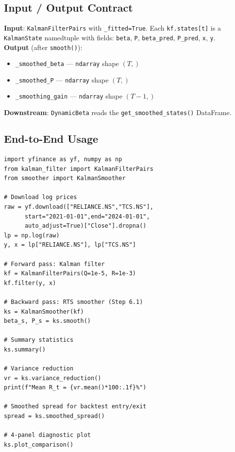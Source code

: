 \documentclass[10pt,a4paper,twocolumn]{article}
\begin{document}
\subsection{Input / Output Contract}

\begin{tcolorbox}[notebox={Interface Specification}]
\textbf{Input}: \texttt{KalmanFilterPairs} with
\texttt{\_fitted=True}.  Each \texttt{kf.states[t]} is a
\texttt{KalmanState} namedtuple with fields:
\texttt{beta}, \texttt{P}, \texttt{beta\_pred},
\texttt{P\_pred}, \texttt{x}, \texttt{y}.\\[4pt]
\textbf{Output} (after \texttt{smooth()}):
\begin{itemize}\setlength\itemsep{0pt}
  \item \texttt{\_smoothed\_beta} --- \texttt{ndarray} shape $(T,)$
  \item \texttt{\_smoothed\_P} --- \texttt{ndarray} shape $(T,)$
  \item \texttt{\_smoothing\_gain} --- \texttt{ndarray} shape $(T-1,)$
\end{itemize}
\textbf{Downstream}: \texttt{DynamicBeta} reads the
\texttt{get\_smoothed\_states()} DataFrame.
\end{tcolorbox}

\subsection{End-to-End Usage}

\begin{tcolorbox}[codebox={Pipeline Usage (RELIANCE / TCS)}]
\begin{lstlisting}[style=pythonplain]
import yfinance as yf, numpy as np
from kalman_filter import KalmanFilterPairs
from smoother import KalmanSmoother

# Download log prices
raw = yf.download(["RELIANCE.NS","TCS.NS"],
      start="2021-01-01",end="2024-01-01",
      auto_adjust=True)["Close"].dropna()
lp = np.log(raw)
y, x = lp["RELIANCE.NS"], lp["TCS.NS"]

# Forward pass: Kalman filter
kf = KalmanFilterPairs(Q=1e-5, R=1e-3)
kf.filter(y, x)

# Backward pass: RTS smoother (Step 6.1)
ks = KalmanSmoother(kf)
beta_s, P_s = ks.smooth()

# Summary statistics
ks.summary()

# Variance reduction
vr = ks.variance_reduction()
print(f"Mean R_t = {vr.mean()*100:.1f}%")

# Smoothed spread for backtest entry/exit
spread = ks.smoothed_spread()

# 4-panel diagnostic plot
ks.plot_comparison()
\end{lstlisting}
\end{tcolorbox}
\end{document}
